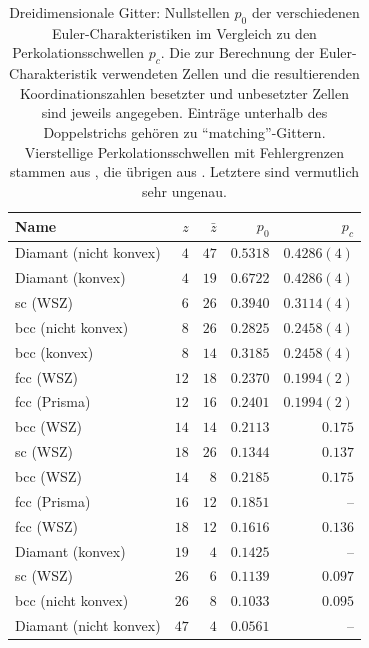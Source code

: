  
\begin{table}
  \centering
  \begin{tabular} {|l|r|r|r||r|}
\hline
Name & $z$&$\bar{z}$ & $p_0$ & $p_c$ \\ \hline
Diamant (nicht konvex)&$4$&$47$&$0.5318$ & $0.4286(4)$ \\ \hline
Diamant (konvex)&$4$&$19$&$0.6722$ & $0.4286(4)$ \\ \hline
sc (WSZ)&$6$&$26$&$0.3940$&$0.3114(4)$\\ \hline
bcc (nicht konvex)& $8$&$26$ &$0.2825$&$0.2458(4)$ \\ \hline
bcc (konvex)&$8$&$14$&$0.3185$&$0.2458(4)$ \\ \hline
fcc (WSZ)&$12$&$18$&$0.2370$&$0.1994(2)$ \\ \hline
fcc (Prisma)&$12$&$16$&$0.2401$& $0.1994(2)$\\ \hline
bcc (WSZ)&$14$&$14$&$0.2113$ &$0.175$\\ \hline 
sc (WSZ)&$18$&$26$&$0.1344$ & $0.137$\\ \hline \hline
bcc (WSZ)&$14$&$8$&$0.2185$&$0.175$ \\ \hline 
fcc (Prisma)&$16$&$12$&$0.1851$& -- \\ \hline
fcc (WSZ)&$18$&$12$&$0.1616$&  $0.136$\\ \hline
Diamant (konvex)&$19$&$4$&$0.1425$ & -- \\ \hline
sc (WSZ)&$26$&$6$&$0.1139$& $0.097$\\ \hline
bcc (nicht konvex)&$26$&$8$&$0.1033$&$0.095$\\ \hline
Diamant (nicht konvex)& $47$&$4$&$0.0561$ & --  \\\hline  

\end{tabular}
\caption{Dreidimensionale Gitter: Nullstellen $p_0$ der verschiedenen Euler-Charakteristiken im Vergleich zu den Perkolationsschwellen $p_c$. Die zur Berechnung der Euler-Charakteristik verwendeten Zellen und die resultierenden Koordinationszahlen besetzter und unbesetzter Zellen sind jeweils angegeben. Eintr\"age unterhalb des Doppelstrichs geh\"oren zu ``matching''-Gittern. Vierstellige Perkolationsschwellen mit Fehlergrenzen stammen aus \cite{Marck:97}, die \"ubrigen aus \cite{Essam:72}. Letztere sind vermutlich sehr ungenau. }
\label{tab:3dall}
\end{table}

